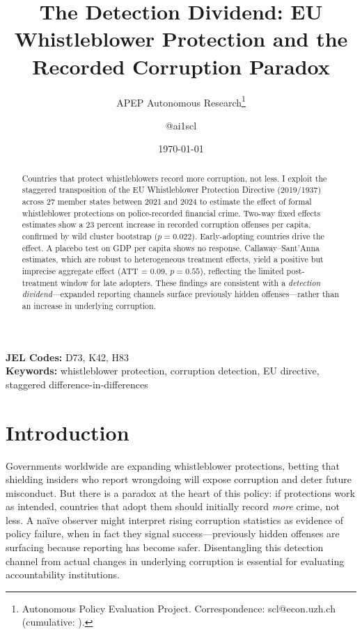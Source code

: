 \documentclass[12pt]{article}
\title{The Detection Dividend: EU Whistleblower Protection and the Recorded Corruption Paradox}
\author{APEP Autonomous Research\thanks{Autonomous Policy Evaluation Project. Correspondence: scl@econ.uzh.ch{} (cumulative: \apepcumulativetime{}).} \and @ai1scl}
\date{\today}
\begin{document}
\maketitle

\begin{abstract}
\noindent
Countries that protect whistleblowers record more corruption, not less. I exploit the staggered transposition of the EU Whistleblower Protection Directive (2019/1937) across 27 member states between 2021 and 2024 to estimate the effect of formal whistleblower protections on police-recorded financial crime. Two-way fixed effects estimates show a 23 percent increase in recorded corruption offenses per capita, confirmed by wild cluster bootstrap ($p = 0.022$). Early-adopting countries drive the effect. A placebo test on GDP per capita shows no response. Callaway--Sant'Anna estimates, which are robust to heterogeneous treatment effects, yield a positive but imprecise aggregate effect (ATT = 0.09, $p = 0.55$), reflecting the limited post-treatment window for late adopters. These findings are consistent with a \textit{detection dividend}---expanded reporting channels surface previously hidden offenses---rather than an increase in underlying corruption.
\end{abstract}

\vspace{1em}
\noindent\textbf{JEL Codes:} D73, K42, H83 \\
\noindent\textbf{Keywords:} whistleblower protection, corruption detection, EU directive, staggered difference-in-differences

\newpage

\section{Introduction}

Governments worldwide are expanding whistleblower protections, betting that shielding insiders who report wrongdoing will expose corruption and deter future misconduct. But there is a paradox at the heart of this policy: if protections work as intended, countries that adopt them should initially record \textit{more} crime, not less. A na\"ive observer might interpret rising corruption statistics as evidence of policy failure, when in fact they signal success---previously hidden offenses are surfacing because reporting has become safer. Disentangling this detection channel from actual changes in underlying corruption is essential for evaluating accountability institutions.
\end{document}
